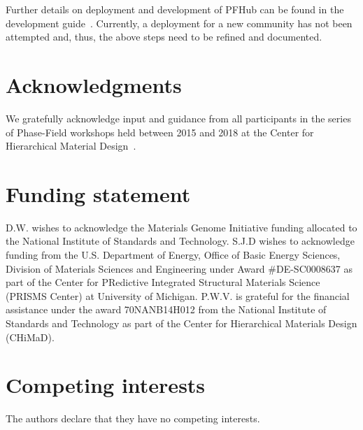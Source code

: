 \documentclass{jors}
\begin{document}
Further details on deployment and development of PFHub can be found in
the development guide~\cite{development_guide}.  Currently, a
deployment for a new community has not been attempted and, thus, the
above steps need to be refined and documented.

\section*{Acknowledgments}

We gratefully acknowledge input and guidance from all participants in
the series of Phase-Field workshops held between 2015 and 2018 at the
Center for Hierarchical Material Design~\cite{workshops}.

\section*{Funding statement}

D.W. wishes to acknowledge the Materials Genome Initiative funding
allocated to the National Institute of Standards and Technology. S.J.D
wishes to acknowledge funding from the U.S. Department of Energy,
Office of Basic Energy Sciences, Division of Materials Sciences and
Engineering under Award \#DE-SC0008637 as part of the Center for
PRedictive Integrated Structural Materials Science (PRISMS Center) at
University of Michigan. P.W.V. is grateful for the financial
assistance under the award 70NANB14H012 from the National Institute of
Standards and Technology as part of the Center for Hierarchical
Materials Design (CHiMaD).

\section*{Competing interests}

The authors declare that they have no competing interests.

\printbibliography
\end{document}
